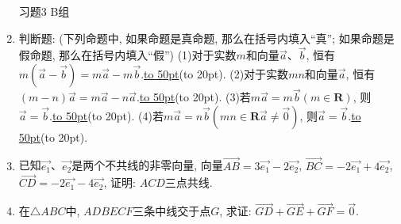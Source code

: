\documentclass[10pt,a4paper]{article}
\newcommand{\blank}[1]{\underline{\hbox to #1pt{}}}
\newcommand{\bracket}[1]{(\hbox to #1pt{})}
\begin{document}
\begin{enumerate}[1.]
习题3  B组
\item 判断题: (下列命题中, 如果命题是真命题, 那么在括号内填入``真''; 如果命题是假命题, 那么在括号内填入``假'')
(1)对于实数$m$和向量$\overrightarrow a$、$\overrightarrow b$, 恒有$m(\overrightarrow a-\overrightarrow b)=m\overrightarrow a-m\overrightarrow b$.\blank{50}\bracket{20}.
(2)对于实数$mn$和向量$\overrightarrow a$, 恒有$(m-n)\overrightarrow a=m\overrightarrow a-n\overrightarrow a$.\blank{50}\bracket{20}.
(3)若$m\overrightarrow a=m\overrightarrow b(m\in \mathbf{R})$, 则$\overrightarrow a=\overrightarrow b$.\blank{50}\bracket{20}.
(4)若$m\overrightarrow a=n\overrightarrow b(mn\in \mathbf{R}\overrightarrow a\ne \overrightarrow 0)$, 则$\overrightarrow a=\overrightarrow b$.\blank{50}\bracket{20}.
\item 已知$\overrightarrow {e_1}$、$\overrightarrow {e_2}$是两个不共线的非零向量, 向量$\overrightarrow {AB}=3\overrightarrow {e_1}-2\overrightarrow {e_2}$, $\overrightarrow {BC}=-2\overrightarrow {e_1}+4\overrightarrow {e_2}$, $\overrightarrow {CD}=-2\overrightarrow {e_1}-4\overrightarrow {e_2}$, 证明: $ACD$三点共线.
\item 在$\triangle ABC$中, $ADBECF$三条中线交于点$G$, 求证: $\overrightarrow {GD}+\overrightarrow {GE}+\overrightarrow {GF}=\overrightarrow 0$.
    

\end{enumerate}
\end{document}
